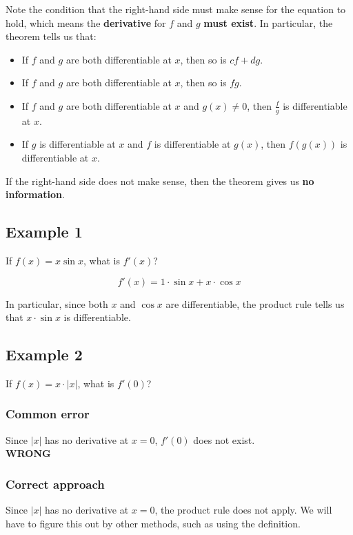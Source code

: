 \documentclass[11pt]{article}
\begin{document}
Note the condition that the right-hand side must make sense for the equation to hold, which means the \textbf{derivative} for \(f\) and \(g\) \textbf{must exist}. In particular, the theorem tells us that:
\begin{itemize}
\item If \(f\) and \(g\) are both differentiable at \(x\), then so is \(cf + dg\).
\item If \(f\) and \(g\) are both differentiable at \(x\), then so is \(fg\).
\item If \(f\) and \(g\) are both differentiable at \(x\) and \(g(x) \neq 0\), then \(\frac{f}{g}\) is differentiable at \(x\).
\item If \(g\) is differentiable at \(x\) and \(f\) is differentiable at \(g(x)\), then \(f(g(x))\) is differentiable at \(x\).
\end{itemize}

If the right-hand side does not make sense, then the theorem gives us \textbf{no information}.

\newpage

\subsection{Example 1}
\label{sec:orgbf501f5}
If \(f(x) = x \sin x\), what is \(f'(x)\)?

\[f'(x) = 1 \cdot \sin x + x \cdot \cos x\]

In particular, since both \(x\) and \(\cos x\) are differentiable, the product rule tells us that \(x \cdot \sin x\) is differentiable.

\subsection{Example 2}
\label{sec:orgb8bafce}
If \(f(x) = x \cdot |x|\), what is \(f'(0)\)?

\subsubsection{Common error}
\label{sec:orge1d4a52}
Since \(|x|\) has no derivative at \(x = 0\), \(f'(0)\) does not exist.
\\[0pt]

\textbf{WRONG}

\subsubsection{Correct approach}
\label{sec:org598df4e}
Since \(|x|\) has no derivative at \(x = 0\), the product rule does not apply. We will have to figure this out by other methods, such as using the definition.
\end{document}
